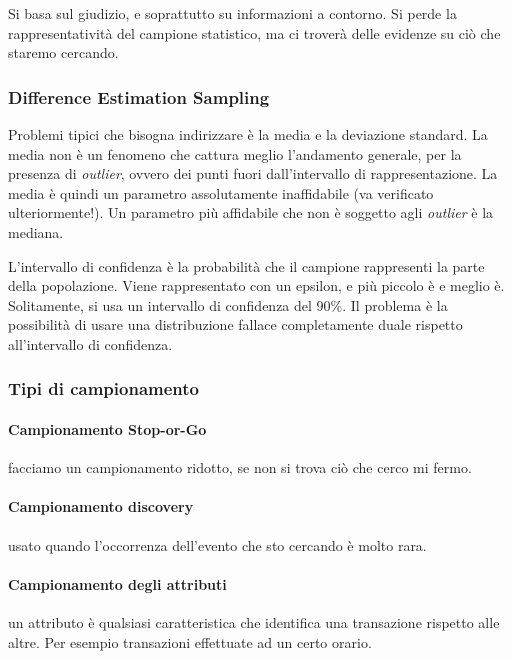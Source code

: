 

Si basa sul giudizio, e soprattutto su informazioni a contorno. Si perde la rappresentatività del campione statistico, ma ci troverà delle evidenze su ciò che staremo cercando.

\subsubsection{Difference Estimation Sampling}

Problemi tipici che bisogna indirizzare è la media e la deviazione standard.
La media non è un fenomeno che cattura meglio l'andamento generale, per la presenza di \textit{outlier}, ovvero dei punti fuori dall'intervallo di rappresentazione. %
La media è quindi un parametro assolutamente inaffidabile (va verificato ulteriormente!). Un parametro più affidabile che non è soggetto agli \textit{outlier} è la mediana.

L'intervallo di confidenza è la probabilità che il campione rappresenti la parte della popolazione. Viene rappresentato con un epsilon, e più piccolo è e meglio è. Solitamente, si usa un intervallo di confidenza del 90\%. Il problema è la possibilità di usare una distribuzione fallace completamente duale rispetto all'intervallo di confidenza.


\subsubsection{Tipi di campionamento}

\paragraph*{Campionamento Stop-or-Go} facciamo un campionamento ridotto, se non si trova ciò che cerco mi fermo.

\paragraph*{Campionamento discovery} usato quando l'occorrenza dell'evento che sto cercando è molto rara.

\paragraph*{Campionamento degli attributi} un attributo è qualsiasi caratteristica che identifica una transazione rispetto alle altre. Per esempio transazioni effettuate ad un certo orario.

